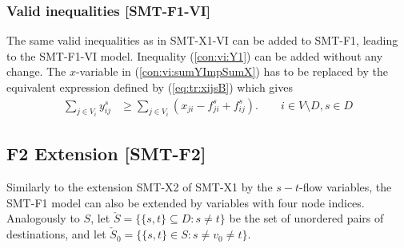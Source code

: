 \subsubsection{Valid inequalities [SMT-F1-VI]}
The same valid inequalities as in SMT-X1-VI can be added to SMT-F1, leading to the SMT-F1-VI model. Inequality (\ref{con:vi:Y1}) can be added without any change. The $x$-variable in (\ref{con:vi:sumYImpSumX}) has to be replaced by the equivalent expression defined by (\ref{eq:tr:xijsB}) which gives
\begin{subequations}[resume]
\begin{flalign}
\label{con:vi:sumYImpSumXTrans} \sum\limits_{j\in V_i }y^{s}_{ij} & \geq \sum\limits_{j\in V_i}  \left(x_{ji}-f^s_{ji}+f^s_{ij}\right).   \quad\quad   i\in V\setminus D, s\in D 
\end{flalign}
\end{subequations}
\subsection{F2 Extension [SMT-F2]}
Similarly to the extension SMT-X2 of SMT-X1 by the $s-t$-flow variables, the SMT-F1 model can also be extended by variables with four node indices. Analogously to $S$, let $\check{S}=\{\{s,t\}\subseteq D: s\neq t\}$ be the set of unordered pairs of destinations, and let $\check{S}_0=\{\{s,t\}\in S: s\neq v_0\neq t\}$. 
